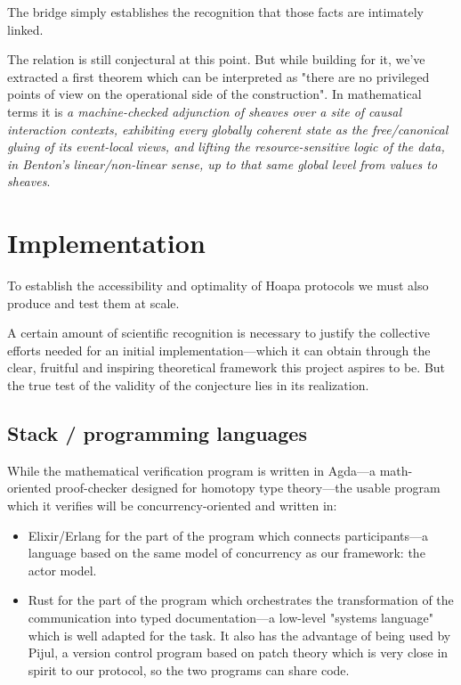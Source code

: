 \documentclass[11pt]{article}
\begin{document}
The bridge simply establishes the recognition that those facts are intimately linked.

The relation is still conjectural at this point. But while building for it, we've extracted a first theorem which can be interpreted as "there are no privileged points of view on the operational side of the construction". In mathematical terms it is \emph{a machine-checked adjunction of sheaves over a site of causal interaction contexts, exhibiting every globally coherent state as the free/canonical gluing of its event-local views, and lifting the resource-sensitive logic of the data, in Benton's linear/non-linear sense, up to that same global level from values to sheaves}.

\section{Implementation}

To establish the accessibility and optimality of Hoapa protocols we must also produce and test them at scale.

A certain amount of scientific recognition is necessary to justify the collective efforts needed for an initial implementation---which it can obtain through the clear, fruitful and inspiring theoretical framework this project aspires to be. But the true test of the validity of the conjecture lies in its realization.

\subsection{Stack / programming languages}

While the mathematical verification program is written in Agda---a math-oriented proof-checker designed for homotopy type theory---the usable program which it verifies will be concurrency-oriented and written in:

\begin{itemize}

\item Elixir/Erlang for the part of the program which connects participants---a language based on the same model of concurrency as our framework: the actor model.

\item Rust for the part of the program which orchestrates the transformation of the communication into typed documentation---a low-level "systems language" which is well adapted for the task. It also has the advantage of being used by Pijul, a version control program based on patch theory which is very close in spirit to our protocol, so the two programs can share code.

\end{itemize}
\end{document}
